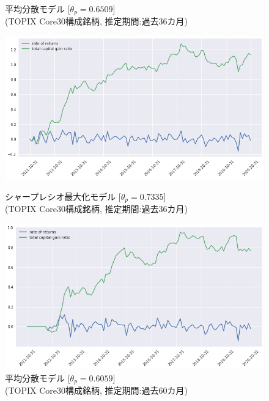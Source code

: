 \documentclass[dvipdfmx,autodetect-engine]{jsarticle}
\begin{document}
\begin{figure}[htbp]
\begin{minipage}{0.5\hsize}
\begin{center}
\end{center}
\caption{平均分散モデル [$\theta_p=0.6509$]\\(TOPIX Core30構成銘柄, 推定期間:過去36カ月)}
\label{fig:21}
\end{minipage}
\begin{minipage}{0.5\hsize}
\begin{center}
\includegraphics[width=1.0\hsize]{./figures/srmp_tpx30_w=36_plot.png}
\end{center}
\caption{シャープレシオ最大化モデル [$\theta_p=0.7335$]\\(TOPIX Core30構成銘柄, 推定期間:過去36カ月)}
\label{fig:22}
\end{minipage}
\begin{minipage}{0.5\hsize}
\begin{center}
\includegraphics[width=1.0\hsize]{./figures/mmvp_tpx30_w=60_plot.png}
\end{center}
\caption{平均分散モデル [$\theta_p=0.6059$]\\(TOPIX Core30構成銘柄, 推定期間:過去60カ月)}
\label{fig:31}
\end{minipage}

\end{figure}
\end{document}
